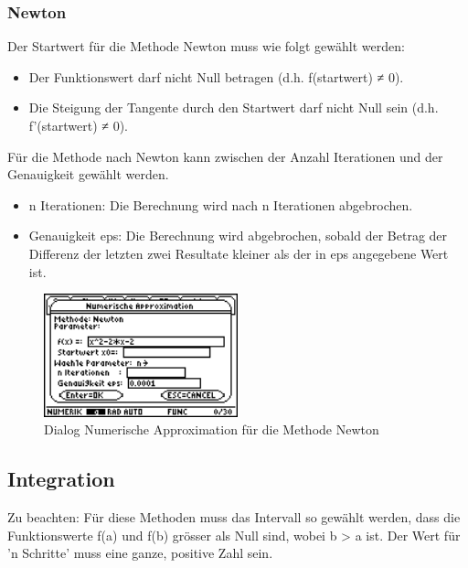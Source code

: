 \documentclass[a4paper,10pt]{scrreprt}
\begin{document}
\subsubsection*{Newton}
Der Startwert f\"ur die Methode Newton muss wie folgt gew\"ahlt werden:
\begin{itemize}
  \item Der Funktionswert darf nicht Null betragen (d.h. f(startwert) ≠ 0).
  \item Die Steigung der Tangente durch den Startwert darf nicht Null sein (d.h. f’(startwert) ≠ 0).
\end{itemize}
F\"ur die Methode nach Newton kann zwischen der Anzahl Iterationen und der Genauigkeit gew\"ahlt werden.
\begin{itemize}
  \item n Iterationen: Die Berechnung wird nach n Iterationen ab­ge­bro­chen.
  \item Genauigkeit eps: Die Berechnung wird abgebrochen, sobald der Betrag der Differenz der letzten zwei Resultate kleiner als der in eps angegebene Wert ist.
\end{itemize}
\begin{figure}[h]
  \centering
  \includegraphics[width=0.5\textwidth]{img/nummeth_image022.png}
  \caption{Dialog Numerische Approximation f\"ur die Methode Newton}
  \label{fig:ParameterApproximationNewton}
\end{figure}

\newpage
\subsection{Integration}
Zu beachten: F\"ur diese Methoden muss das Intervall so gew\"ahlt werden, dass die Funktions­werte f(a) und f(b) gr\"osser als Null sind, wobei b > a ist. Der Wert f\"ur 'n Schritte' muss eine ganze, positive Zahl sein.
\end{document}
